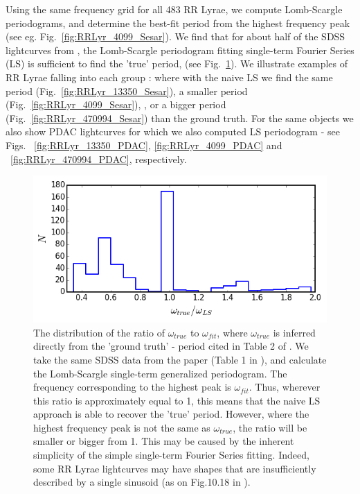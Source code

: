 \documentclass[DM,lsstdraft,toc,usenatbib]{lsstdoc}
\begin{document}
Using the same frequency grid for all 483 RR Lyrae, we compute Lomb-Scargle periodograms, and determine the best-fit period from the highest frequency peak (see eg. Fig.~\ref{fig:RRLyr_4099_Sesar}).  We find that for about half of the SDSS lightcurves from \cite{sesar2010}, the Lomb-Scargle periodogram fitting single-term Fourier Series (LS) is sufficient to find the 'true' period, (see Fig.~\ref{fig:RRLyr_period_ratios}). We illustrate examples of RR Lyrae falling into each group : where with the naive LS we find the same period (Fig.~\ref{fig:RRLyr_13350_Sesar}), a smaller period (Fig.~\ref{fig:RRLyr_4099_Sesar}), , or a bigger period  (Fig.~\ref{fig:RRLyr_470994_Sesar}) than the ground truth. For the same objects we also show PDAC lightcurves for which we also computed LS periodogram  -  see Figs. ~\ref{fig:RRLyr_13350_PDAC}, \ref{fig:RRLyr_4099_PDAC} and ~\ref{fig:RRLyr_470994_PDAC}, respectively. 


\begin{figure}
\begin{centering}
\includegraphics[width=0.5\columnwidth]{figs/Fig_3_RRLyr_omega_ratio}
\caption{The distribution of the ratio of $\omega_{true}$ to $\omega_{fit}$, where $\omega_{true}$ is inferred directly from the 'ground truth' - period cited in Table 2 of \citep{sesar2010}. We take the same SDSS data from the paper (Table 1 in \citep{sesar2010}), and calculate the Lomb-Scargle single-term generalized periodogram. The frequency corresponding to the highest peak is  $\omega_{fit}$. Thus, wherever  this ratio is approximately equal to 1, this means that the naive  LS approach is able to recover the 'true' period.  However,  where the highest  frequency peak is not the same as $\omega_{true}$, the ratio will be smaller or bigger from 1. This may be caused by the inherent simplicity of the simple single-term Fourier Series fitting. Indeed, some RR Lyrae lightcurves may have shapes that are insufficiently described by a single sinusoid (as on Fig.10.18  in \citep{ivezic2014}). }
\label{fig:RRLyr_period_ratios}
\end{centering}
\end{figure}
\end{document}
